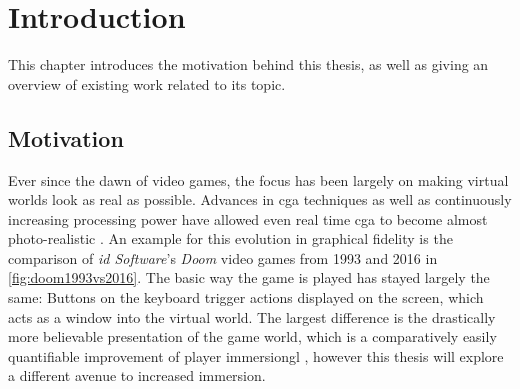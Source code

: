 
\chapter{Introduction}\label{chapter:Introduction}
                
This chapter introduces the motivation behind this thesis, as well as giving an overview of existing work related to its topic.


\section{Motivation}

Ever since the dawn of video games, the focus has been largely on making virtual worlds look as real as possible. Advances in \gls{cga} techniques as well as continuously increasing processing power have allowed even real time \gls{cga} to become almost photo-realistic \autocite{photorealismRealtime}.
\newline
An example for this evolution in graphical fidelity is the comparison of \textit{id Software}'s \textit{Doom} video games from 1993 and 2016 in \autoref{fig:doom1993vs2016}. The basic way the game is played has stayed largely the same: Buttons on the keyboard trigger actions displayed on the screen, which acts as a window into the virtual world. The largest difference is the drastically more believable presentation of the game world, which is a comparatively easily quantifiable improvement of player \gls{immersiongl} \autocite{gameImmersion}, however this thesis will explore a different avenue to increased immersion.

